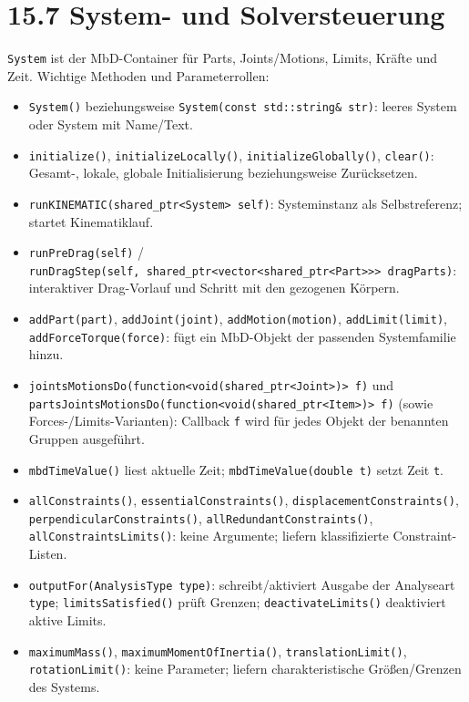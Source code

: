 \documentclass[
  12pt
]{book}
\providecommand{\tightlist}{%
  \setlength{\itemsep}{0pt}\setlength{\parskip}{0pt}}
\begin{document}
\hypertarget{system--und-solversteuerung}{%
\section{\texorpdfstring{{15.7} System- und
Solversteuerung}{15.7 System- und Solversteuerung}}\label{system--und-solversteuerung}}

\texttt{System} ist der MbD-Container für Parts, Joints/Motions, Limits,
Kräfte und Zeit. Wichtige Methoden und Parameterrollen:

\begin{itemize}
\tightlist
\item
  \texttt{System()} beziehungsweise
  \texttt{System(const\ std::string\&\ str)}: leeres System oder System
  mit Name/Text.
\item
  \texttt{initialize()}, \texttt{initializeLocally()},
  \texttt{initializeGlobally()}, \texttt{clear()}: Gesamt-, lokale,
  globale Initialisierung beziehungsweise Zurücksetzen.
\item
  \texttt{runKINEMATIC(shared\_ptr\textless{}System\textgreater{}\ self)}:
  Systeminstanz als Selbstreferenz; startet Kinematiklauf.
\item
  \texttt{runPreDrag(self)} /
  \texttt{runDragStep(self,\ shared\_ptr\textless{}vector\textless{}shared\_ptr\textless{}Part\textgreater{}\textgreater{}\textgreater{}\ dragParts)}:
  interaktiver Drag-Vorlauf und Schritt mit den gezogenen Körpern.
\item
  \texttt{addPart(part)}, \texttt{addJoint(joint)},
  \texttt{addMotion(motion)}, \texttt{addLimit(limit)},
  \texttt{addForceTorque(force)}: fügt ein MbD-Objekt der passenden
  Systemfamilie hinzu.
\item
  \texttt{jointsMotionsDo(function\textless{}void(shared\_ptr\textless{}Joint\textgreater{})\textgreater{}\ f)}
  und
  \texttt{partsJointsMotionsDo(function\textless{}void(shared\_ptr\textless{}Item\textgreater{})\textgreater{}\ f)}
  (sowie Forces-/Limits-Varianten): Callback \texttt{f} wird für jedes
  Objekt der benannten Gruppen ausgeführt.
\item
  \texttt{mbdTimeValue()} liest aktuelle Zeit;
  \texttt{mbdTimeValue(double\ t)} setzt Zeit \texttt{t}.
\item
  \texttt{allConstraints()}, \texttt{essentialConstraints()},
  \texttt{displacementConstraints()},
  \texttt{perpendicularConstraints()},
  \texttt{allRedundantConstraints()}, \texttt{allConstraintsLimits()}:
  keine Argumente; liefern klassifizierte Constraint-Listen.
\item
  \texttt{outputFor(AnalysisType\ type)}: schreibt/aktiviert Ausgabe der
  Analyseart \texttt{type}; \texttt{limitsSatisfied()} prüft Grenzen;
  \texttt{deactivateLimits()} deaktiviert aktive Limits.
\item
  \texttt{maximumMass()}, \texttt{maximumMomentOfInertia()},
  \texttt{translationLimit()}, \texttt{rotationLimit()}: keine
  Parameter; liefern charakteristische Größen/Grenzen des Systems.
\end{itemize}
\end{document}
